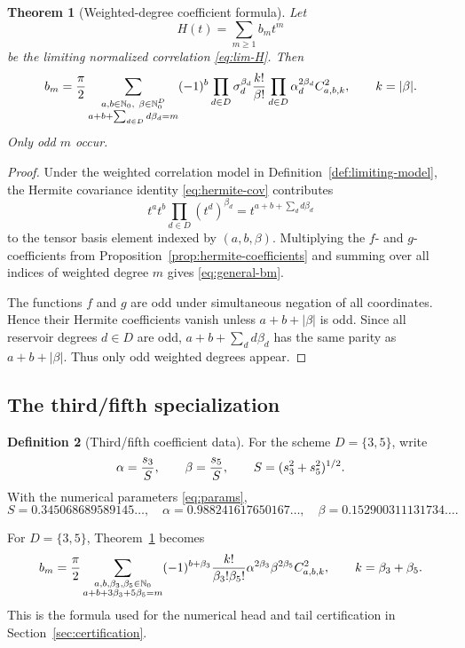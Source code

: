 \documentclass[11pt]{article}
\newcommand{\Nzero}{\mathbb N_0}
\newcommand{\1}{\mathbf 1}
\theoremstyle{plain}
\newtheorem{theorem}{Theorem}[section]
\theoremstyle{definition}
\newtheorem{definition}[theorem]{Definition}
\theoremstyle{remark}
\begin{document}
\begin{theorem}[Weighted-degree coefficient formula]\label{thm:coefficient-formula}
Let
\[
  H(t)=\sum_{m\ge1}b_m t^m
\]
be the limiting normalized correlation \eqref{eq:lim-H}.  Then
\begin{equation}\label{eq:general-bm}
  b_m={\pi\over2}
  \sum_{\substack{a,b\in\Nzero,\ \beta\in\Nzero^D\\ a+b+\sum_{d\in D}d\beta_d=m}}
  (-1)^b\prod_{d\in D}\sigma_d^{\beta_d}
  {k!\over \beta!}
  \prod_{d\in D}\alpha_d^{2\beta_d}
  C_{a,b,k}^2,
  \qquad k=|\beta|.
\end{equation}
Only odd $m$ occur.
\end{theorem}

\begin{proof}
Under the weighted correlation model in Definition~\ref{def:limiting-model}, the Hermite covariance identity \eqref{eq:hermite-cov} contributes
\[
  t^a t^b\prod_{d\in D}(t^d)^{\beta_d}
  =t^{a+b+\sum_d d\beta_d}
\]
to the tensor basis element indexed by $(a,b,\beta)$.  Multiplying the $f$- and $g$-coefficients from Proposition~\ref{prop:hermite-coefficients} and summing over all indices of weighted degree $m$ gives \eqref{eq:general-bm}.

The functions $f$ and $g$ are odd under simultaneous negation of all coordinates.  Hence their Hermite coefficients vanish unless $a+b+|\beta|$ is odd.  Since all reservoir degrees $d\in D$ are odd, $a+b+\sum_d d\beta_d$ has the same parity as $a+b+|\beta|$.  Thus only odd weighted degrees appear.
\end{proof}

\subsection{The third/fifth specialization}\label{subsec:third-fifth-coefficients}

\begin{definition}[Third/fifth coefficient data]\label{def:third-fifth-coeff-data}
For the scheme $D=\{3,5\}$, write
\[
  \alpha={s_3\over S},\qquad \beta={s_5\over S},
  \qquad S=(s_3^2+s_5^2)^{1/2}.
\]
With the numerical parameters \eqref{eq:params},
\[
  S=0.345068689589145\ldots,
  \quad
  \alpha=0.988241617650167\ldots,
  \quad
  \beta=0.152900311131734\ldots .
\]
\end{definition}

For $D=\{3,5\}$, Theorem~\ref{thm:coefficient-formula} becomes
\begin{equation}\label{eq:35-bm}
  b_m={\pi\over2}
  \sum_{\substack{a,b,\beta_3,\beta_5\in\Nzero\\ a+b+3\beta_3+5\beta_5=m}}
  (-1)^{b+\beta_3}
  {k!\over \beta_3!\beta_5!}
  \alpha^{2\beta_3}\beta^{2\beta_5}
  C_{a,b,k}^2,
  \qquad k=\beta_3+\beta_5.
\end{equation}
This is the formula used for the numerical head and tail certification in Section~\ref{sec:certification}.
\end{document}
